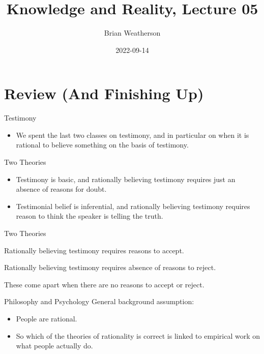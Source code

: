 \documentclass[
  17pt,
  letterpaper,
  ignorenonframetext,
  aspectratio=169,
]{beamer}
\title{Knowledge and Reality, Lecture 05}
\author{Brian Weatherson}
\date{2022-09-14}
\providecommand{\tightlist}{%
  \setlength{\itemsep}{0pt}\setlength{\parskip}{0pt}}\usepackage{longtable,booktabs,array}
\begin{document}
\frame{\titlepage}
\ifdefined\Shaded\renewenvironment{Shaded}{\begin{tcolorbox}[sharp corners, borderline west={3pt}{0pt}{shadecolor}, interior hidden, breakable, boxrule=0pt, enhanced, frame hidden]}{\end{tcolorbox}}\fi

\hypertarget{review-and-finishing-up}{%
\section{Review (And Finishing Up)}\label{review-and-finishing-up}}

\begin{frame}{Testimony}
\protect\hypertarget{testimony}{}
\begin{itemize}[<+->]
\tightlist
\item
  We spent the last two classes on testimony, and in particular on when
  it is rational to believe something on the basis of testimony.
\end{itemize}
\end{frame}

\begin{frame}{Two Theories}
\protect\hypertarget{two-theories}{}
\begin{itemize}[<+->]
\tightlist
\item
  Testimony is basic, and rationally believing testimony requires just
  an absence of reasons for doubt.
\item
  Testimonial belief is inferential, and rationally believing testimony
  requires reason to think the speaker is telling the truth.
\end{itemize}
\end{frame}

\begin{frame}{Two Theories}
\protect\hypertarget{two-theories-1}{}
\begin{description}[<+->]
\tightlist
\item[Reductionism]
Rationally believing testimony requires reasons to accept.
\item[Anti-Reductionism]
Rationally believing testimony requires absence of reasons to reject.
\end{description}

These come apart when there are no reasons to accept or reject.
\end{frame}

\begin{frame}{Philosophy and Psychology}
\protect\hypertarget{philosophy-and-psychology}{}
General background assumption:

\begin{itemize}[<+->]
\tightlist
\item
  People are rational.
\item
  So which of the theories of rationality is correct is linked to
  empirical work on what people actually do.
\end{itemize}
\end{frame}
\end{document}
